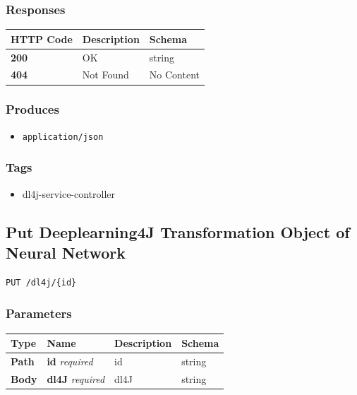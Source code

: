 \subsubsection{Responses}\label{responses-13}

\begin{longtable}[]{@{}lll@{}}
\toprule
HTTP Code & Description & Schema\tabularnewline
\midrule
\endhead
\textbf{200} & OK & string\tabularnewline
\textbf{404} & Not Found & No Content\tabularnewline
\bottomrule
\end{longtable}

\subsubsection{Produces}\label{produces-13}

\begin{itemize}
\tightlist
\item
  \texttt{application/json}
\end{itemize}

\subsubsection{Tags}\label{tags-13}

\begin{itemize}
\tightlist
\item
  dl4j-service-controller
\end{itemize}

\subsection{Put Deeplearning4J Transformation Object of Neural
Network}\label{put-deeplearning4j-transformation-object-of-neural-network}

\begin{verbatim}
PUT /dl4j/{id}
\end{verbatim}

\subsubsection{Parameters}\label{parameters-11}

\begin{longtable}[]{@{}llll@{}}
\toprule
Type & Name & Description & Schema\tabularnewline
\midrule
\endhead
\textbf{Path} & \textbf{id} \emph{required} & id & string\tabularnewline
\textbf{Body} & \textbf{dl4J} \emph{required} & dl4J &
string\tabularnewline
\bottomrule
\end{longtable}

